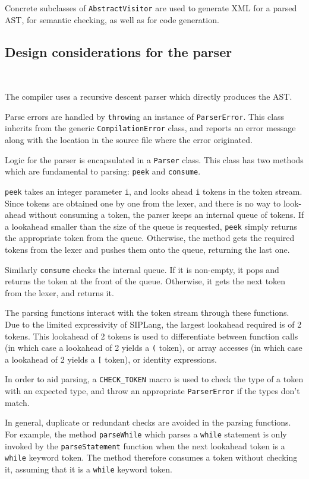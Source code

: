 \documentclass[11pt,a4paper]{scrartcl}
\begin{document}
Concrete subclasses of \verb!AbstractVisitor! are used to generate XML for a parsed AST, for semantic checking, as well as for code generation.

\subsection{Design considerations for the parser}~\label{sec:parser}

The compiler uses a recursive descent parser which directly produces the AST.

Parse errors are handled by \verb!throw!ing an instance of \verb!ParserError!. This class inherits from the generic \verb!CompilationError! class, and reports an error message along with the location in the source file where the error originated.

Logic for the parser is encapsulated in a \verb!Parser! class. This class has two methods which are fundamental to parsing: \verb!peek! and \verb!consume!.

\verb!peek! takes an integer parameter \verb!i!, and looks ahead \verb!i! tokens in the token stream. Since tokens are obtained one by one from the lexer, and there is no way to look-ahead without consuming a token, the parser keeps an internal queue of tokens. If a lookahead smaller than the size of the queue is requested, \verb!peek! simply returns the appropriate token from the queue. Otherwise, the method gets the required tokens from the lexer and pushes them onto the queue, returning the last one.

Similarly \verb!consume! checks the internal queue. If it is non-empty, it pops and returns the token at the front of the queue. Otherwise, it gets the next token from the lexer, and returns it.

The parsing functions interact with the token stream through these functions. Due to the limited expressivity of SIPLang, the largest lookahead required is of 2 tokens. This lookahead of 2 tokens is used to differentiate between function calls (in which case a lookahead of 2 yields a \verb!(! token), or array accesses (in which case a lookahead of 2 yields a \verb![! token), or identity expressions.

In order to aid parsing, a \verb!CHECK_TOKEN! macro is used to check the type of a token with an expected type, and throw an appropriate \verb!ParserError! if the types don't match.

In general, duplicate or redundant checks are avoided in the parsing functions. For example, the method \verb!parseWhile! which parses a \verb!while! statement is only invoked by the \verb!parseStatement! function when the next lookahead token is a \verb!while! keyword token. The method therefore consumes a token without checking it, assuming that it is a \verb!while! keyword token.
\end{document}
